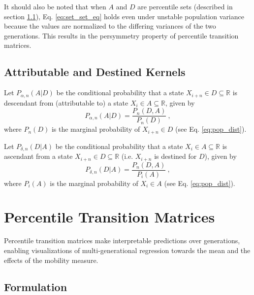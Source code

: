 \documentclass{svproc} %
\begin{document}
It should also be noted that when $A$ and $D$ are percentile sets (described in section \ref{formulation}), Eq. \ref{eq:set_set_eq} holds even under unstable population variance because the values are normalized to the differing variances of the two generations. This results in the persymmetry property of percentile transition matrices.


\subsection{Attributable and Destined Kernels}

\begin{definition}
Let $P_{\alpha , n}(A | D)$ be the conditional probability that a state $X_{i+n} \in D \subseteq \mathbb{R}$ is descendant from (attributable to) a state $X_i \in A \subseteq \mathbb{R}$, given by
\begin{equation}
P_{\alpha , n}(A | D) = \frac{P_n(D, A)}{P_n(D)} \ , 
\label{eq:attributable}
\end{equation}
where $P_n(D)$ is the marginal probability of $X_{i+n} \in D$ (see Eq. \ref{eq:pop_dist}). 
\label{def:destined}
\end{definition}



\begin{definition}
Let $P_{\delta , n}(D | A)$  be the conditional probability that a state $X_i \in A \subseteq \mathbb{R}$ is ascendant from a state $X_{i+n} \in D \subseteq \mathbb{R}$ (i.e. $X_{i+n}$ is destined for $D$), given by
\begin{equation}
P_{\delta , n}(D | A) = \frac{P_n(D, A)}{P_i(A)} \ , 
\label{eq:destined}
\end{equation}
where $P_i(A)$ is the marginal probability of $X_i \in A$ (see Eq. \ref{eq:pop_dist}). 
\label{def:attributable}
\end{definition}


\section{Percentile Transition Matrices}

Percentile transition matrices make interpretable predictions over generations, enabling visualizations of multi-generational regression towards the mean and the effects of the mobility measure. 

\subsection{Formulation} \label{formulation}
\end{document}
